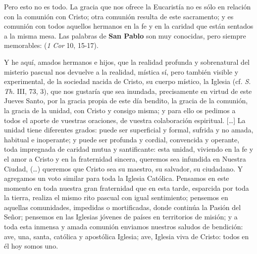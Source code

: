 \begin{body}
Pero esto no es todo. La gracia que nos ofrece la Eucaristía no es sólo en relación con la comunión con Cristo; otra comunión resulta de este sacramento; y es comunión con todos aquellos hermanos en la fe y en la caridad que están sentados a la misma mesa. Las palabras de \textbf{San Pablo} son muy conocidas, pero siempre memorables:  (\textit{1 Cor} 10, 15-17).
\end{body}


\begin{body}
Y he aquí, amados hermanos e hijos, que la realidad profunda y sobrenatural del misterio pascual nos devuelve a la realidad, mística sí, pero también visible y experimental, de la sociedad nacida de Cristo, su cuerpo místico, la Iglesia (cf. \textit{S. Th.} III, 73, 3), que nos gustaría que sea inundada, precisamente en virtud de este Jueves Santo, por la gracia propia de este día bendito, la gracia de la comunión, la gracia de la unidad, con Cristo y consigo misma; y para ello os pedimos a todos el aporte de vuestras oraciones, de vuestra colaboración espiritual. [\ldots] La unidad tiene diferentes grados: puede ser superficial y formal, sufrida y no amada, habitual e inoperante; y puede ser profunda y cordial, convencida y operante, toda impregnada de caridad mutua y santificante: esta unidad, viviendo en la fe y el amor a Cristo y en la fraternidad sincera, queremos sea infundida en Nuestra Ciudad, (\ldots) queremos que Cristo sea su maestro, su salvador, su ciudadano. Y agregamos un voto similar para toda la Iglesia Católica. Pensamos en este momento en toda nuestra gran fraternidad que en esta tarde, esparcida por toda la tierra, realiza el mismo rito pascual con igual sentimiento; pensemos en aquellas comunidades, impedidas o mortificadas, donde continúa la Pasión del Señor; pensemos en las Iglesias jóvenes de países en territorios de misión; y a toda esta inmensa y amada comunión enviamos nuestros saludos de bendición: ave, una, santa, católica y apostólica Iglesia; ave, Iglesia viva de Cristo: todos en él hoy somos uno. 
\end{body}

